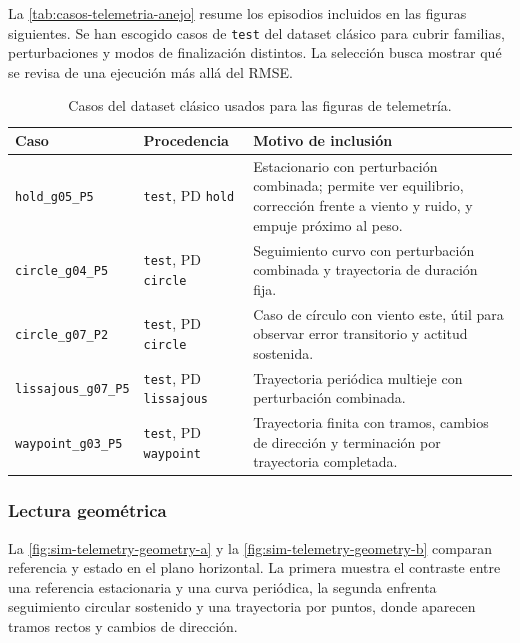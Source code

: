 La \autoref{tab:casos-telemetria-anejo} resume los episodios incluidos en las
figuras siguientes. Se han escogido casos de \texttt{test} del dataset clásico
para cubrir familias, perturbaciones y modos de finalización distintos. La
selección busca mostrar qué se revisa de una ejecución más allá del RMSE.

\begin{table}[H]
\caption{Casos del dataset clásico usados para las figuras de telemetría.}
\label{tab:casos-telemetria-anejo}
\small
\setlength{\tabcolsep}{4pt}
\begin{tabularx}{\textwidth}{>{\raggedright\arraybackslash}p{} >{\raggedright\arraybackslash}p{} X}
\toprule
Caso & Procedencia & Motivo de inclusión \\
\midrule
\texttt{hold\_g05\_P5} & \texttt{test}, PD \texttt{hold} & Estacionario con
perturbación combinada; permite ver equilibrio, corrección frente a viento y
ruido, y empuje próximo al peso. \\
\texttt{circle\_g04\_P5} & \texttt{test}, PD \texttt{circle} & Seguimiento
curvo con perturbación combinada y trayectoria de duración fija. \\
\texttt{circle\_g07\_P2} & \texttt{test}, PD \texttt{circle} & Caso de círculo
con viento este, útil para observar error transitorio y actitud sostenida. \\
\texttt{lissajous\_g07\_P5} & \texttt{test}, PD \texttt{lissajous} &
Trayectoria periódica multieje con perturbación combinada. \\
\texttt{waypoint\_g03\_P5} & \texttt{test}, PD \texttt{waypoint} & Trayectoria finita
con tramos, cambios de dirección y terminación por trayectoria completada. \\
\bottomrule
\end{tabularx}
\end{table}

\subsubsection*{Lectura geométrica}

La \autoref{fig:sim-telemetry-geometry-a} y la
\autoref{fig:sim-telemetry-geometry-b} comparan referencia y estado en el plano
horizontal. La primera muestra el contraste entre una referencia estacionaria y
una curva periódica, la segunda enfrenta seguimiento circular sostenido y una
trayectoria por puntos, donde aparecen tramos rectos y cambios de dirección.

